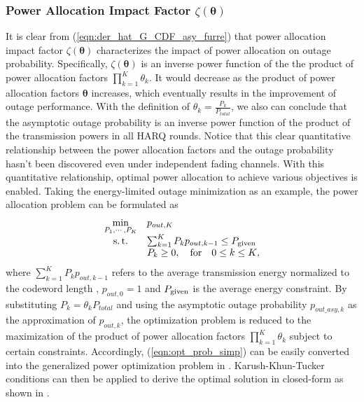 \documentclass[12pt,onecolumn,draftcls]{IEEEtran}
\newcommand{\bs}{\boldsymbol}
\begin{document}
\subsubsection{Power Allocation Impact Factor $\zeta (\bs \theta)$}
It is clear from (\ref{eqn:der_hat_G_CDF_asy_furre}) that power allocation impact factor $\zeta(\bs \theta)$ characterizes the impact of power allocation on outage probability. Specifically, $\zeta(\bs \theta)$ is an inverse power function of the the product of power allocation factors ${\prod\nolimits_{k = 1}^K {{\theta_k}} }$. It would decrease as the product of power allocation factors $\bs \theta$ increases, which eventually results in the improvement of outage performance. With the definition of $\theta_k=\frac{{{P_k}}}{{{P_{total}}}}$, we also can conclude that the asymptotic outage probability is an inverse power function of the product of the transmission powers in all HARQ rounds. Notice that this clear quantitative relationship between the power allocation factors and the outage probability hasn't been discovered even under independent fading channels. With this quantitative relationship, optimal power allocation to achieve various objectives is enabled. Taking the energy-limited outage minimization as an example, the power allocation problem can be formulated as
\begin{equation}\label{eqn:opt_prob_simp}
\begin{array}{*{20}{cl}}
{\mathop {\rm min}\limits_{{P_1},\cdots,{P_K}} }&{p_{out,K}}\\
{{\rm{s.}}\,{\rm{t.}}}&{{\sum\nolimits_{k = 1}^K {{P_k}{p_{out,k - 1}}}} \le P_{\rm given} }\\
{}&{{P_k} \ge 0,\quad{\rm for}\quad 0 \le k \le K},\\
\end{array}
\end{equation}
where ${\sum\nolimits_{k = 1}^K {{P_k}{p_{out,k - 1}}}}$ refers to the average transmission energy normalized to the codeword length \cite{makki2013green},  $p_{out,0}=1$ and $P_{\rm given}$ is the average energy constraint. By substituting $P_k= {\theta_k} P_{total}$ and using the asymptotic outage probability ${p_{out\_{asy},k}}$ as the approximation of $p_{out,k}$, the optimization problem is reduced to the maximization of the product of power allocation factors ${\prod\nolimits_{k = 1}^K {{\theta_k}} }$ subject to certain constraints. Accordingly, (\ref{eqn:opt_prob_simp}) can be easily converted into the generalized power optimization problem in \cite[Eq.6]{chaitanya2016energy}. Karush-Khun-Tucker conditions can then be applied to derive the optimal solution in closed-form as shown in \cite[Eq.15]{chaitanya2016energy}.
\end{document}
